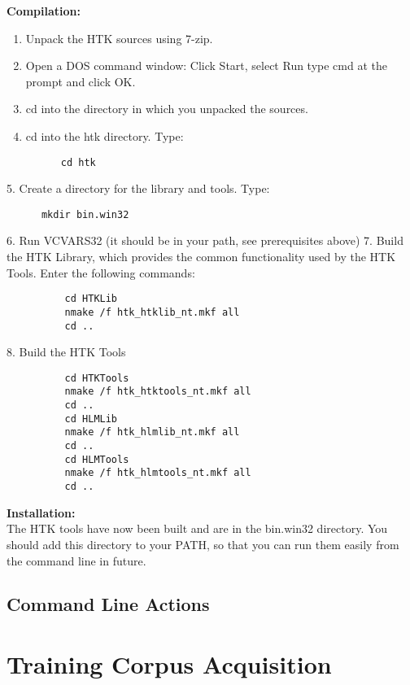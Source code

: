\documentclass{wileySev}
\begin{document}
\textbf{Compilation:}
\begin{enumerate}
\item Unpack the HTK sources using 7-zip.
\item Open a DOS command window: Click Start, select Run type cmd at the prompt and click OK.
\item cd into the directory in which you unpacked the sources.
\item cd into the htk directory. Type:
\begin{verbatim}
      cd htk
\end{verbatim}
\end{enumerate}

   5. Create a directory for the library and tools. Type:

\begin{verbatim}
      mkdir bin.win32
\end{verbatim}

   6. Run VCVARS32 (it should be in your path, see prerequisites above)
   7. Build the HTK Library, which provides the common functionality
      used by the HTK Tools. Enter the following commands:

\begin{verbatim}
          cd HTKLib
          nmake /f htk_htklib_nt.mkf all
          cd ..
\end{verbatim}

   8. Build the HTK Tools
\begin{verbatim}
          cd HTKTools
          nmake /f htk_htktools_nt.mkf all
          cd ..
          cd HLMLib
          nmake /f htk_hlmlib_nt.mkf all
          cd ..
          cd HLMTools
          nmake /f htk_hlmtools_nt.mkf all
          cd ..
\end{verbatim}

\textbf{Installation:}\\
The HTK tools have now been built and are in the bin.win32
directory. You should add this directory to your PATH, so that you can
run them easily from the command line in future.

\section{Command Line Actions}

\chapter{Training Corpus Acquisition}
\end{document}

